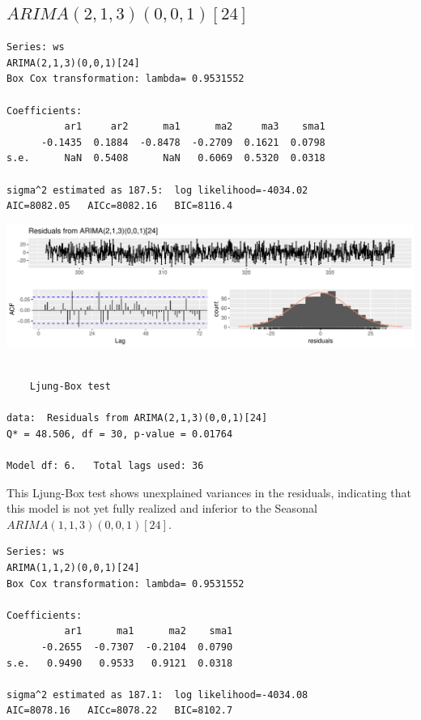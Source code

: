 \documentclass[openany]{book}
\begin{document}
\hypertarget{arima21300124}{%
\subsection{\texorpdfstring{\(ARIMA(2,1,3)(0,0,1)[24]\)}{ARIMA(2,1,3)(0,0,1){[}24{]}}}\label{arima21300124}}

\begin{verbatim}
Series: ws 
ARIMA(2,1,3)(0,0,1)[24] 
Box Cox transformation: lambda= 0.9531552 

Coefficients:
          ar1     ar2      ma1      ma2     ma3    sma1
      -0.1435  0.1884  -0.8478  -0.2709  0.1621  0.0798
s.e.      NaN  0.5408      NaN   0.6069  0.5320  0.0318

sigma^2 estimated as 187.5:  log likelihood=-4034.02
AIC=8082.05   AICc=8082.16   BIC=8116.4
\end{verbatim}

\includegraphics{Group2_Project1_Fall2019_files/figure-latex/unnamed-chunk-23-1.pdf}

\begin{verbatim}

    Ljung-Box test

data:  Residuals from ARIMA(2,1,3)(0,0,1)[24]
Q* = 48.506, df = 30, p-value = 0.01764

Model df: 6.   Total lags used: 36
\end{verbatim}

This Ljung-Box test shows unexplained variances in the residuals,
indicating that this model is not yet fully realized and inferior to the
Seasonal \(ARIMA (1,1,3)(0,0,1)[24]\).

\begin{verbatim}
Series: ws 
ARIMA(1,1,2)(0,0,1)[24] 
Box Cox transformation: lambda= 0.9531552 

Coefficients:
          ar1      ma1      ma2    sma1
      -0.2655  -0.7307  -0.2104  0.0790
s.e.   0.9490   0.9533   0.9121  0.0318

sigma^2 estimated as 187.1:  log likelihood=-4034.08
AIC=8078.16   AICc=8078.22   BIC=8102.7
\end{verbatim}
\end{document}
